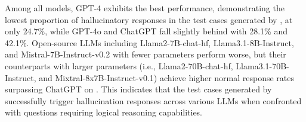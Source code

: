 Among all models, GPT-4 exhibits the best performance, demonstrating the lowest proportion of hallucinatory responses in the test cases generated by \tool, at only 24.7\%, while GPT-4o and ChatGPT fall slightly behind with 
28.1\% and 42.1\%. Open-source LLMs including Llama2-7B-chat-hf, Llama3.1-8B-Instruct, and Mistral-7B-Instruct-v0.2 with fewer parameters perform worse, but their counterparts with larger parameters (i.e., Llama2-70B-chat-hf, Llama3.1-70B-Instruct, and Mixtral-8x7B-Instruct-v0.1) achieve higher normal response rates surpassing ChatGPT on \tool. %
This indicates that the test cases generated by \tool successfully trigger hallucination responses across various LLMs when confronted with questions requiring logical reasoning capabilities.


